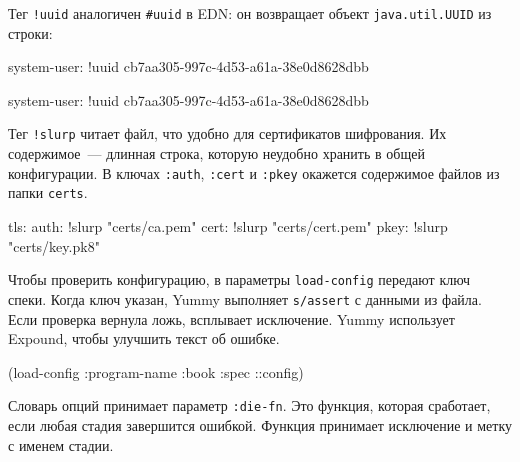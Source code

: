\fi

Тег \verb|!uuid| аналогичен \verb|#uuid| в EDN: он возвращает объект
\verb|java.util.UUID| из строки:

\ifx\DEVICETYPE\MOBILE

\begin{english}
  \begin{yaml}
system-user: !uuid
    cb7aa305-997c-4d53-a61a-38e0d8628dbb
  \end{yaml}
\end{english}

\else

\begin{english}
  \begin{yaml}
system-user: !uuid cb7aa305-997c-4d53-a61a-38e0d8628dbb
  \end{yaml}
\end{english}

\fi

Тег \verb|!slurp| читает файл, что удобно для сертификатов шифрования. Их
содержимое~--- длинная строка, которую неудобно хранить в общей конфигурации. В
ключах \verb|:auth|, \verb|:cert| и \verb|:pkey| окажется содержимое файлов из
папки \verb|certs|.

\begin{english}
  \begin{yaml}
tls:
  auth: !slurp "certs/ca.pem"
  cert: !slurp "certs/cert.pem"
  pkey: !slurp "certs/key.pk8"
  \end{yaml}
\end{english}


Чтобы проверить конфигурацию, в параметры \verb|load-config| передают ключ
спеки. Когда ключ указан, Yummy выполняет \verb|s/assert| с данными из
файла. Если проверка вернула ложь, всплывает исключение. Yummy использует
Expound, чтобы улучшить текст об ошибке.

\begin{english}
  \begin{clojure}
(load-config {:program-name :book
              :spec ::config})
  \end{clojure}
\end{english}


\mnoindent
Словарь опций принимает параметр \verb|:die-fn|. Это функция, которая
сработает, если любая стадия завершится ошибкой. Функция принимает исключение
и метку с именем стадии.

